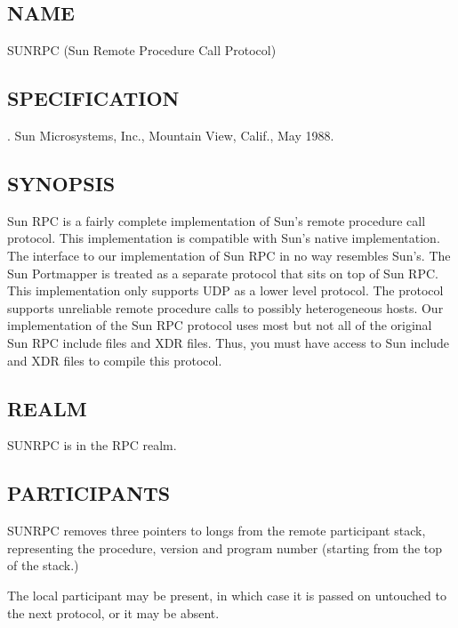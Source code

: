 %
%
%

\subsection*{NAME}

\noindent SUNRPC (Sun Remote Procedure Call Protocol)

\subsection*{SPECIFICATION}

.
Sun Microsystems, Inc., Mountain View, Calif., May 1988.

\subsection*{SYNOPSIS}

\noindent Sun RPC is a fairly complete implementation of Sun's remote
procedure call protocol. This implementation is compatible with Sun's
native implementation. The interface to our implementation of Sun RPC
in no way resembles Sun's. The Sun Portmapper is treated as a separate
protocol that sits on top of Sun RPC. This implementation only
supports UDP as a lower level protocol. The protocol supports
unreliable remote procedure calls to possibly heterogeneous hosts. Our
implementation of the Sun RPC protocol uses most but not all of the
original Sun RPC include files and XDR files.  Thus, you must have
access to Sun include and XDR files to compile this protocol.

\subsection*{REALM}

SUNRPC is in the RPC realm.

\subsection*{PARTICIPANTS}

SUNRPC removes three pointers to longs from the remote
participant stack, representing the procedure, version and program
number (starting from the top of the stack.)

The local participant may be present, in which case it is passed on
untouched to the next protocol, or it may be absent.


